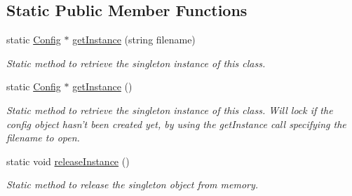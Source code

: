 \subsection*{Static Public Member Functions}
\begin{DoxyCompactItemize}
\item 
static \hyperlink{class_config}{Config} $\ast$ \hyperlink{class_config_a43d2f3e2a15a143a7ab3159a00657385}{getInstance} (string filename)
\begin{DoxyCompactList}\small\item\em Static method to retrieve the singleton instance of this class. \end{DoxyCompactList}\item 
static \hyperlink{class_config}{Config} $\ast$ \hyperlink{class_config_af7d6f89fc34627f15523df0b62acd7e5}{getInstance} ()
\begin{DoxyCompactList}\small\item\em Static method to retrieve the singleton instance of this class. Will lock if the config object hasn't been created yet, by using the getInstance call specifying the filename to open. \end{DoxyCompactList}\item 
\hypertarget{class_config_ad7a2b071db637e26aade2f863ce8f648}{
static void \hyperlink{class_config_ad7a2b071db637e26aade2f863ce8f648}{releaseInstance} ()}
\label{class_config_ad7a2b071db637e26aade2f863ce8f648}

\begin{DoxyCompactList}\small\item\em Static method to release the singleton object from memory. \end{DoxyCompactList}\end{DoxyCompactItemize}
